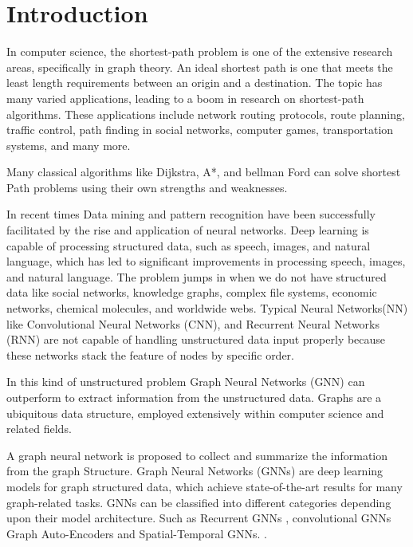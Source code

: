 
\section{Introduction}
In computer science, the shortest-path problem is one of the extensive research areas, speciﬁcally in graph theory. An ideal shortest path is one that meets the least length requirements between an origin and a destination. The topic has many varied applications, leading to a boom in research on shortest-path algorithms. These applications include network routing protocols, route planning, traﬃc control, path ﬁnding in social networks, computer games, transportation systems, and many more. \cite{DBLP:journals/corr/MadkourARRB17}

Many classical algorithms like Dijkstra, A*, and bellman Ford can solve shortest Path problems using their own strengths and weaknesses.
 
In recent times Data mining and pattern recognition have been successfully facilitated by the rise and application of neural networks. Deep learning is capable of processing structured data, such as speech, images, and natural language, which has led to significant improvements in processing speech, images, and natural language. The problem jumps in when we do not have structured data like social networks, knowledge graphs, complex file systems, economic networks, chemical molecules, and worldwide webs. Typical Neural Networks(NN) like Convolutional Neural Networks (CNN), and Recurrent Neural Networks (RNN) are not capable of handling unstructured data input properly because these networks stack the feature of nodes by specific order. \cite{Mendoza_2019}

In this kind of unstructured problem Graph Neural Networks (GNN) can outperform to extract information from the unstructured data. Graphs are a ubiquitous data structure, employed extensively within computer science and related fields.\cite{DBLP:journals/corr/abs-1709-05584}

A graph neural network is proposed to collect and summarize the information from the graph Structure. \cite{DBLP:journals/corr/abs-1812-04202}
Graph Neural Networks (GNNs)  are deep learning models for graph structured data, which achieve state-of-the-art results for many graph-related tasks.\cite{data7010010}
GNNs can be classified into different categories depending upon their model architecture. \cite{DBLP:journals/corr/abs-1901-00596}
Such as Recurrent GNNs \cite{inproceedings}, convolutional GNNs \cite{DBLP:journals/corr/HamiltonYL17}
\cite{DBLP:journals/corr/KipfW16}
Graph Auto-Encoders \cite{https://doi.org/10.48550/arxiv.1611.07308}
and Spatial-Temporal GNNs. \cite{Yan_Xiong_Lin_2018}.
